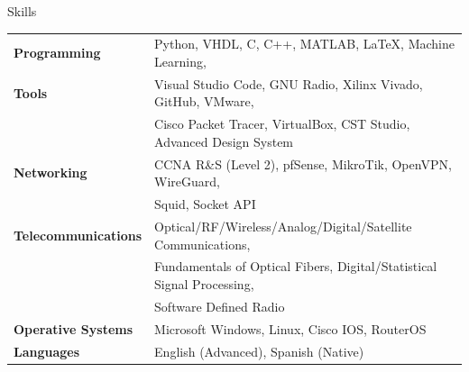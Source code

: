 \documentclass{resume} %
\begin{document}

\begin{rSection}{Skills}

    \begin{tabular}{ @{} >{\bfseries}l @{\hspace{6ex}} l }
        Programming        & Python, VHDL, C, C++, MATLAB, \LaTeX, Machine Learning,                \\
        Tools              & Visual Studio Code, GNU Radio, Xilinx Vivado, GitHub, VMware,          \\
                           & Cisco Packet Tracer, VirtualBox, CST Studio, Advanced Design System    \\
        Networking         & CCNA R\&S (Level 2), pfSense, MikroTik, OpenVPN, WireGuard,            \\
                           & Squid, Socket API                                                      \\
        Telecommunications & Optical/RF/Wireless/Analog/Digital/Satellite Communications,           \\
                           & Fundamentals of Optical Fibers, Digital/Statistical Signal Processing, \\
                           & Software Defined Radio                                                 \\
        Operative Systems  & Microsoft Windows, Linux, Cisco IOS, RouterOS                          \\
        Languages          & English (Advanced), Spanish (Native)
    \end{tabular}

\end{rSection}
\end{document}
